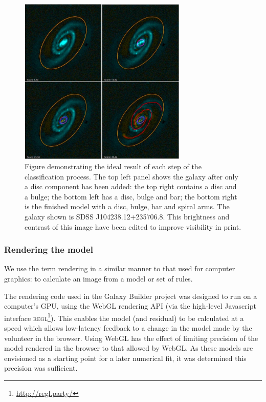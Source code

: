 \documentclass[../main.tex]{subfiles}
\begin{document}
\begin{figure}
  \includegraphics[width=8cm]{images/residualProgress.jpg}
  \caption{Figure demonstrating the ideal result of each step of the classification process. The top left panel shows the galaxy after only a disc component has been added: the top right contains a disc and a bulge; the bottom left has a disc, bulge and bar; the bottom right is the finished model with a disc, bulge, bar and spiral arms. The galaxy shown is SDSS J104238.12+235706.8. This brightness and contrast of this image have been edited to improve visibility in print.}
  \label{fig:residualsStepByStep}
\end{figure}

\subsubsection{Rendering the model}

We use the term rendering in a similar manner to that used for computer graphics: to calculate an image from a model or set of rules.

The rendering code used in the Galaxy Builder project was designed to run on a computer's GPU, using the WebGL rendering API (via the high-level Javascript interface \textsc{regl}\footnote{\url{http://regl.party/}}). This enables the model (and residual) to be calculated at a speed which allows low-latency feedback to a change in the model made by the volunteer in the browser. Using WebGL has the effect of limiting precision of the model rendered in the browser to that allowed by WebGL. As these models are envisioned as a starting point for a later numerical fit, it was determined this precision was sufficient.
\end{document}
